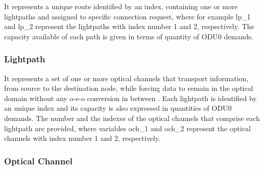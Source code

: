 It represents a unique route identified by an index, containing one or more lightpaths and assigned to specific connection request, where for example lp\_1 and lp\_2 represent the lightpaths with index number 1 and 2, respectively. The capacity available of each path is given in terms of quantity of ODU0 demands.

\subsubsection{Lightpath}

\begin{table}[H]
	\centering
	\caption{Structure of a "Lightpath" variable.}
	\label{lightPath}
\end{table}

It represents a set of one or more optical channels that transport information, from source to the destination node, while forcing data to remain in the optical domain without any \gls{o-e-o} conversion in between \cite{lightpath}. Each lightpath is identified by an unique index and its capacity is also expressed in quantities of ODU0 demands. The number and the indexes of the optical channels that comprise each lightpath are provided, where variables och\_1 and och\_2 represent the optical channels with index number 1 and 2, respectively.

\subsubsection{Optical Channel}

